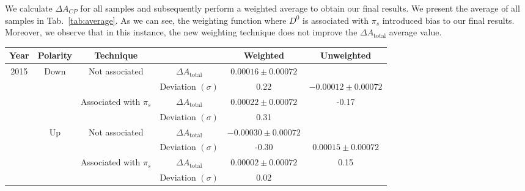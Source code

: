 \documentclass{article}
\begin{document}
        We calculate $\Delta A_{CP}$ for all samples and subsequently perform a weighted average to obtain our final results.
        We present the average of all samples in Tab.~\ref{tab:average}.
        As we can see, the weighting function where $D^0$ is associated with $\pi_s$ introduced bias to our final results.
        Moreover, we observe that in this instance, the new weighting technique does not improve the $\Delta A_\text{total}$ average value.

        \begin{center}
                \begin{tabular}{c|c|c|c|c|c}
                        Year & Polarity & Technique & & Weighted & Unweighted\\
                        \hline\hline
                        \multirow{8}{*}{2015} & \multirow{4}{*}{Down} & \multirow{2}{*}{Not associated} & $\Delta A_\text{total}$ & $0.00016\pm 0.00072$& \\
                        & & & Deviation $(\sigma)$ & 0.22& $-0.00012\pm 0.00072$\\
                        \cline{3-5}
                        & & \multirow{2}{*}{Associated with $\pi_s$} & $\Delta A_\text{total}$ & $0.00022\pm 0.00072$& -0.17\\
                        & & & Deviation $(\sigma)$ & 0.31& \\
                        \cline{2-6}
                        & \multirow{4}{*}{Up} & \multirow{2}{*}{Not associated} & $\Delta A_\text{total}$ & $-0.00030\pm 0.00072$& \\
                        & & & Deviation $(\sigma)$ & -0.30& $0.00015\pm 0.00072$\\
                        \cline{3-5}
                        & & \multirow{2}{*}{Associated with $\pi_s$} & $\Delta A_\text{total}$ & $0.00002\pm 0.00072$& 0.15\\
                        & & & Deviation $(\sigma)$ & 0.02& \\
                        \hline


\end{tabular}
\end{center}
\end{document}
